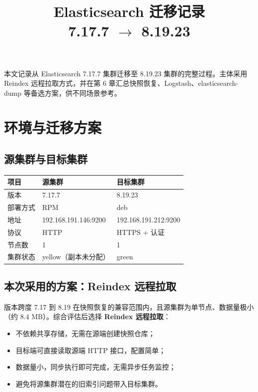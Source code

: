 \documentclass[11pt,a4paper,openany]{ctexbook}
\title{Elasticsearch 迁移记录\\\large 7.17.7 $\rightarrow$ 8.19.23}
\author{}
\date{}
\begin{document}
\frontmatter
\maketitle

\begin{note}
本文记录从 Elasticsearch 7.17.7 集群迁移至 8.19.23 集群的完整过程。主体采用 Reindex 远程拉取方式，并在第 6 章汇总快照恢复、Logstash、elasticsearch-dump 等备选方案，供不同场景参考。
\end{note}

\tableofcontents
\mainmatter

\chapter{环境与迁移方案}

\section{源集群与目标集群}

\begin{center}
\begin{tabular}{@{}lll@{}}
\toprule
项目 & 源集群 & 目标集群 \\
\midrule
版本 & 7.17.7 & 8.19.23 \\
部署方式 & RPM & deb \\
地址 & 192.168.191.146:9200 & 192.168.191.212:9200 \\
协议 & HTTP & HTTPS + 认证 \\
节点数 & 1 & 1 \\
集群状态 & yellow（副本未分配） & green \\
\bottomrule
\end{tabular}
\end{center}

\section{本次采用的方案：Reindex 远程拉取}

版本跨度 7.17 到 8.19 在快照恢复的兼容范围内，且源集群为单节点、数据量极小（约 8.4 MB）。综合评估后选择 \textbf{Reindex 远程拉取}：

\begin{itemize}[leftmargin=1.4em]
  \item 不依赖共享存储，无需在源端创建快照仓库；
  \item 目标端可直接读取源端 HTTP 接口，配置简单；
  \item 数据量小，同步执行即可完成，无需异步任务监控；
  \item 避免将源集群潜在的旧索引问题带入目标集群。
\end{itemize}
\end{document}
